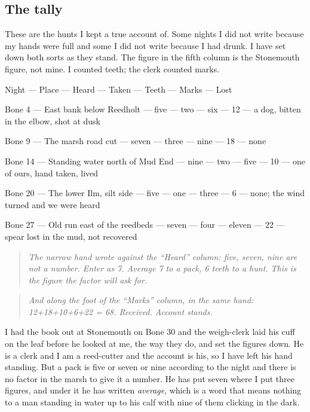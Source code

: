 \documentclass{design/chronicle}
\begin{document}
\subsection*{The tally}

These are the hunts I kept a true account of. Some nights I did not write because my hands were full and some I did not write because I had drunk. I have set down both sorts as they stand. The figure in the fifth column is the Stonemouth figure, not mine. I counted teeth; the clerk counted marks.

Night — Place — Heard — Taken — Teeth — Marks — Lost\par

Bone 4 — East bank below Reedholt — five — two — six — 12 — a dog, bitten in the elbow, shot at dusk\par

Bone 9 — The marsh road cut — seven — three — nine — 18 — none\par

Bone 14 — Standing water north of Mud End — nine — two — five — 10 — one of ours, hand taken, lived\par

Bone 20 — The lower Ilm, silt side — five — one — three — 6 — none; the wind turned and we were heard\par

Bone 27 — Old run east of the reedbeds — seven — four — eleven — 22 — spear lost in the mud, not recovered\par

\begin{quote}\itshape \emph{The narrow hand wrote against the “Heard” column:} five, seven, nine are not a number. Enter as 7. Average 7 to a pack, 6 teeth to a hunt. This is the figure the factor will ask for.\end{quote}

\begin{quote}\itshape \emph{And along the foot of the “Marks” column, in the same hand:} 12+18+10+6+22 = 68. Received. Account stands.\end{quote}

I had the book out at Stonemouth on Bone 30 and the weigh-clerk laid his cuff on the leaf before he looked at me, the way they do, and set the figures down. He is a clerk and I am a reed-cutter and the account is his, so I have left his hand standing. But a pack is five or seven or nine according to the night and there is no factor in the marsh to give it a number. He has put seven where I put three figures, and under it he has written \emph{average}, which is a word that means nothing to a man standing in water up to his calf with nine of them clicking in the dark.
\end{document}
